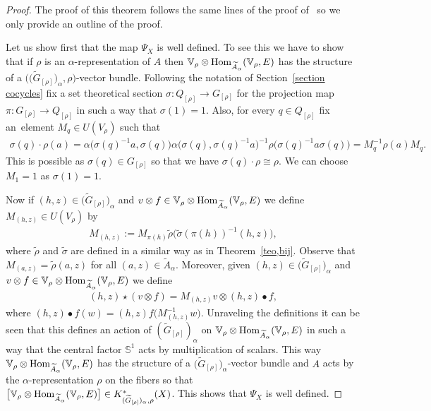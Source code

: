 \documentclass[pdftex]{sigma}
\def\S{\mathbb{S}}
\def\V{\mathbb{V}}
\DeclareMathOperator{\Hom}{\textup{Hom}}
\theoremstyle{definition}
\numberwithin{equation}{section}
\begin{document}
\begin{proof}
The proof of this theorem follows the same lines of the proof of~\cite[Theorem 3.1]{GomezUribe}
so we only provide an outline of the proof.

Let us show first that the map $\Psi_{X}$ is well defined. To see this we have to
show that if $\rho$ is an $\alpha$-representation of $A$ then
$\V_{\rho}\otimes\Hom_{\widetilde{A}_{\alpha}}(\V_{\rho},E)$
has the structure of a $\big(\big(\widetilde{G}_{[\rho]}\big)_{\alpha},\rho\big)$-vector bundle.
Following the notation of Section~\ref{section cocycles} fix a set theoretical
section $\sigma\colon Q_{[\rho]}\to G_{[\rho]}$ for the projection map $\pi\colon G_{[\rho]}\to Q_{[\rho]}$
in such a way that $\sigma(1)=1$. Also, for every $q\in Q_{[\rho]}$ fix an~element
$M_{q}\in U(V_{\rho})$ such that
\begin{gather*}
\sigma(q)\cdot \rho(a) =\alpha\big(\sigma(q)^{-1}a,\sigma(q)\big)\alpha\big(\sigma(q),\sigma(q)^{-1}a\big)^{-1}
\rho\big(\sigma(q)^{-1}a\sigma(q)\big)=M_{q}^{-1}\rho(a)M_{q}.
\end{gather*}
This is possible as $\sigma(q)\in G_{[\rho]}$ so that we have $\sigma(q)\cdot \rho\cong \rho$.
We can choose $M_{1}=1$ as $\sigma(1)=1$.

Now if $(h,z)\in \big(\widetilde{G}_{[\rho]}\big)_{\alpha}$ and $v\otimes f\in
\V_{\rho}\otimes \Hom_{\widetilde{A}_{\alpha}}(\V_{\rho},E)$
we define $M_{(h,z)}\in U(V_{\rho})$ by
\begin{gather*}
M_{(h,z)}:=M_{\pi(h)}\tilde{\rho}\big(\tilde{\sigma}(\pi(h))^{-1}(h,z)\big),
\end{gather*}
where $\tilde{\rho}$ and $\tilde{\sigma}$ are defined in a similar way as in
Theorem~\ref{teo,bij}. Observe that $M_{(a,z)}=\tilde{\rho}(a,z)$ for all
$(a,z)\in \widetilde{A}_{\alpha}$. Moreover, given $(h,z)\in \big(\widetilde{G}_{[\rho]}\big)_{\alpha}$
and $v\otimes f\in \V_{\rho}\otimes \Hom_{\widetilde{A}_{\alpha}}(\V_{\rho},E)$
we define
\begin{gather*}
(h,z)\star(v\otimes f)=M_{(h,z)}v\otimes (h,z)\bullet f,
\end{gather*}
where $(h,z)\bullet f (w)=(h,z)f\big(M_{(h,z)}^{-1}w\big)$. Unraveling the definitions it
can be seen that this defines an action of
$(\widetilde{G}_{[\rho]})_{\alpha}$ on $\V_{\rho}\otimes \Hom_{\widetilde{A}_{\alpha}}(\V_{\rho},E)$
in such a way that the central factor $\S^{1}$ acts by multiplication of scalars.
This way $\V_{\rho}\otimes \Hom_{\widetilde{A}_{\alpha}}(\V_{\rho},E)$ has the structure
of a $\big(\widetilde{G}_{[\rho]}\big)_{\alpha}$-vector bundle and $A$ acts by the
$\alpha$-representation $\rho$ on the fibers so that
$\big[\V_{\rho}\otimes \Hom_{\widetilde{A}_{\alpha}}(\V_{\rho},E)\big]\in
K^{\ast}_{(\widetilde{G}_{[\rho]})_{\alpha},\rho}(X)$. This shows that
$\Psi_{X}$ is well defined.



\end{proof}
\end{document}
